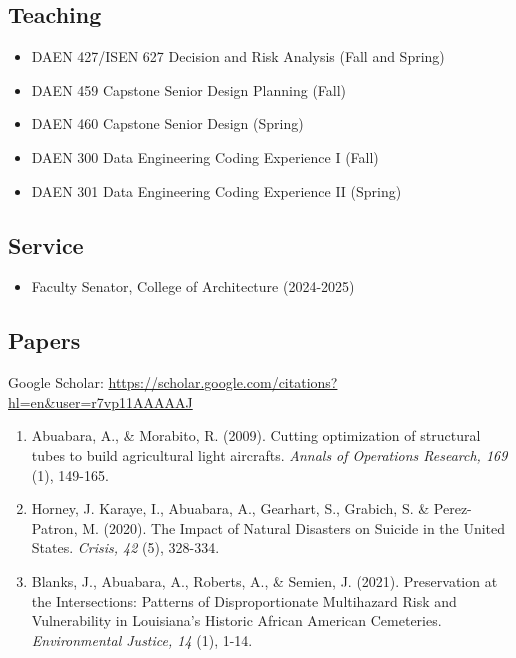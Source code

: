 \documentclass[11pt]{article}
\begin{document}
\subsection*{Teaching}
\begin{itemize}[leftmargin=20pt]
\item DAEN 427/ISEN 627 Decision and Risk Analysis (Fall and Spring)
\item DAEN 459 Capstone Senior Design Planning (Fall)
\item DAEN 460 Capstone Senior Design (Spring)
\item DAEN 300 Data Engineering Coding Experience I (Fall)
\item DAEN 301 Data Engineering Coding Experience II (Spring)
\end{itemize}

\subsection*{Service}
\begin{itemize}[leftmargin=20pt]
\item Faculty Senator, College of Architecture (2024-2025)
\end{itemize}

\subsection*{Papers}
\vspace{-5pt}
{\small Google Scholar: \url{https://scholar.google.com/citations?hl=en&user=r7vp11AAAAAJ}}
\begin{enumerate}[leftmargin=20pt]
\item Abuabara, A., \& Morabito, R. (2009). Cutting optimization of structural tubes to build agricultural light aircrafts. \emph{Annals of Operations Research, 169} (1), 149-165.
\item Horney, J. Karaye, I., Abuabara, A., Gearhart, S., Grabich, S. \& Perez-Patron, M. (2020). The Impact of Natural Disasters on Suicide in the United States. \emph{Crisis, 42} (5), 328-334.
\item Blanks, J., Abuabara, A., Roberts, A., \& Semien, J. (2021). Preservation at the Intersections: Patterns of Disproportionate Multihazard Risk and Vulnerability in Louisiana's Historic African American Cemeteries. \emph{Environmental Justice, 14} (1), 1-14.
\end{enumerate}
\end{document}
